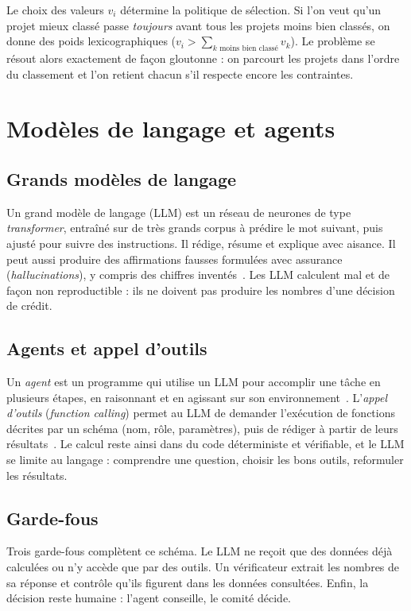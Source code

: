 Le choix des valeurs $v_i$ détermine la politique de sélection. Si l'on veut qu'un projet mieux classé passe
\emph{toujours} avant tous les projets moins bien classés, on donne des poids lexicographiques
($v_i > \sum_{k \text{ moins bien classé}} v_k$). Le problème se résout alors exactement de façon gloutonne :
on parcourt les projets dans l'ordre du classement et l'on retient chacun s'il respecte encore les contraintes.

\section{Modèles de langage et agents}

\subsection{Grands modèles de langage}

Un grand modèle de langage (LLM) est un réseau de neurones de type \textit{transformer}, entraîné sur de très
grands corpus à prédire le mot suivant, puis ajusté pour suivre des instructions. Il rédige, résume et explique avec
aisance. Il peut aussi produire des affirmations fausses formulées avec assurance (\emph{hallucinations}),
y compris des chiffres inventés~\cite{ji2023}. Les LLM calculent mal et de façon non reproductible : ils ne doivent
pas produire les nombres d'une décision de crédit.

\subsection{Agents et appel d'outils}

Un \emph{agent} est un programme qui utilise un LLM pour accomplir une tâche en plusieurs étapes, en raisonnant et
en agissant sur son environnement~\cite{yao2023}. L'\emph{appel d'outils} (\textit{function calling}) permet au LLM
de demander l'exécution de fonctions décrites par un schéma (nom, rôle, paramètres), puis de rédiger à partir de
leurs résultats~\cite{schick2023}. Le calcul reste ainsi dans du code déterministe et vérifiable, et le LLM se limite
au langage : comprendre une question, choisir les bons outils, reformuler les résultats.

\subsection{Garde-fous}

Trois garde-fous complètent ce schéma. Le LLM ne reçoit que des données déjà calculées ou n'y accède que par des
outils. Un vérificateur extrait les nombres de sa réponse et contrôle qu'ils figurent dans les données consultées.
Enfin, la décision reste humaine : l'agent conseille, le comité décide.
